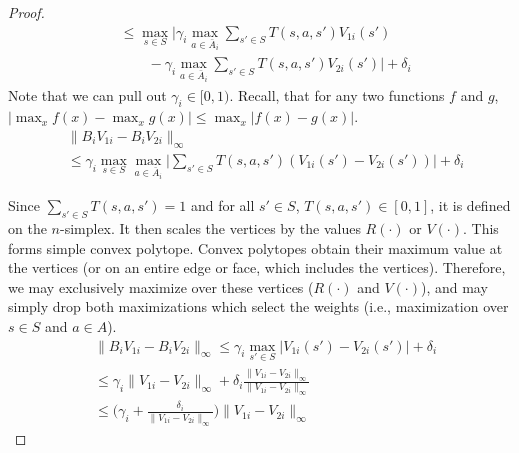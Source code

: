 \begin{proof}
\begin{align*}
    &\leq \max_{s \in S} \Big| \gamma_i \max_{a \in \bar{A}_i} \sum_{s' \in S} T(s, a, s') V_{1i}(s') \\
    &\quad \quad - \gamma_i \max_{a \in \bar{A}_i} \sum_{s' \in S} T(s, a, s') V_{2i}(s') \Big| + \delta_i
\end{align*}
Note that we can pull out $\gamma_i \in [0, 1)$. Recall, that for any two functions $f$ and $g$, $| \max_x f(x) - \max_x g(x) | \leq \max_x | f(x) - g(x) |$.
\begin{align*}
    &\| B_i V_{1i} - B_i V_{2i} \|_\infty \\
    &\leq \gamma_i \max_{s \in S} \max_{a \in \bar{A}_i} \Big| \sum_{s' \in S} T(s, a, s') (V_{1i}(s') - V_{2i}(s')) \Big| + \delta_i
\end{align*}

Since $\sum_{s' \in S} T(s, a, s') = 1$ and for all $s' \in S$, $T(s, a, s') \in [0, 1]$, it is defined on the $n$-simplex. It then scales the vertices by the values $R(\cdot)$ or $V(\cdot)$. This forms simple convex polytope. Convex polytopes obtain their maximum value at the vertices (or on an entire edge or face, which includes the vertices). Therefore, we may exclusively maximize over these vertices ($R(\cdot)$ and $V(\cdot)$), and may simply drop both maximizations which select the weights (i.e., maximization over $s \in S$ and $a \in A$).
\begin{align*}
    &\| B_i V_{1i} - B_i V_{2i} \|_\infty \leq \gamma_i \max_{s' \in S} \Big| V_{1i}(s') - V_{2i}(s') \Big| + \delta_i \\
    &\leq \gamma_i \| V_{1i} - V_{2i} \|_\infty + \delta_i \frac{\| V_{1i} - V_{2i} \|_\infty}{\| V_{1i} - V_{2i} \|_\infty} \\
    &\leq \Big( \gamma_i + \frac{\delta_i}{\| V_{1i} - V_{2i} \|_\infty} \Big) \| V_{1i} - V_{2i} \|_\infty
\end{align*}


\end{proof}
